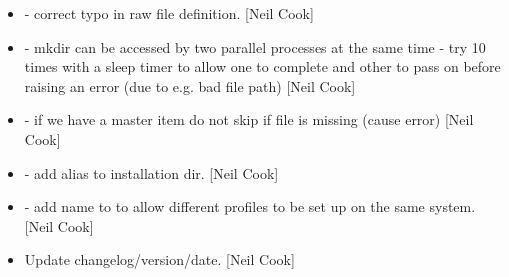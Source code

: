 \documentclass[a4paper,10pt,english]{report}
\begin{document}
\begin{itemize}
\item {} 
 - correct typo in raw file
definition. {[}Neil Cook{]}

\item {} 
 - mkdir can be accessed by two parallel processes at
the same time - try 10 times with a sleep timer to allow one to
complete and other to pass on before raising an error (due to e.g. bad
file path) {[}Neil Cook{]}

\item {} 
 - if we have a master item do
not skip if file is missing (cause error) {[}Neil Cook{]}

\item {} 
 - add alias to installation dir. {[}Neil Cook{]}

\item {} 
 - add \textendash{}name to  to allow different profiles
to be set up on the same system. {[}Neil Cook{]}

\item {} 
Update changelog/version/date. {[}Neil Cook{]}

\end{itemize}
\end{document}
